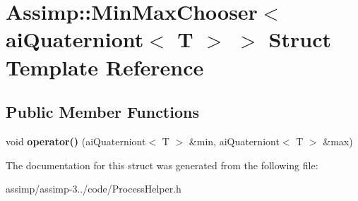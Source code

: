 \hypertarget{struct_assimp_1_1_min_max_chooser_3_01ai_quaterniont_3_01_t_01_4_01_4}{\section{Assimp\+:\+:Min\+Max\+Chooser$<$ ai\+Quaterniont$<$ T $>$ $>$ Struct Template Reference}
\label{struct_assimp_1_1_min_max_chooser_3_01ai_quaterniont_3_01_t_01_4_01_4}
}
\subsection*{Public Member Functions}
\begin{DoxyCompactItemize}
\item 
\hypertarget{struct_assimp_1_1_min_max_chooser_3_01ai_quaterniont_3_01_t_01_4_01_4_a51a348aeca6d9cc4d90631aeb2f657c2}{void {\bfseries operator()} (ai\+Quaterniont$<$ T $>$ \&min, ai\+Quaterniont$<$ T $>$ \&max)}\label{struct_assimp_1_1_min_max_chooser_3_01ai_quaterniont_3_01_t_01_4_01_4_a51a348aeca6d9cc4d90631aeb2f657c2}

\end{DoxyCompactItemize}


The documentation for this struct was generated from the following file\+:\begin{DoxyCompactItemize}
\item 
assimp/assimp-\/3../code/Process\+Helper.\+h\end{DoxyCompactItemize}
